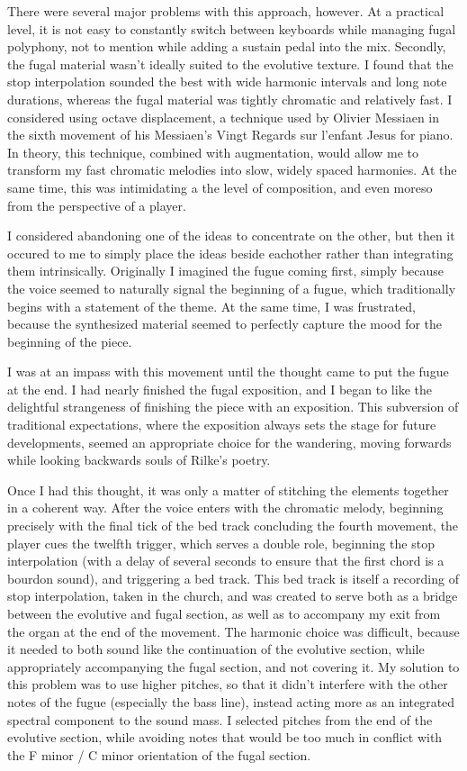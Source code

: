 \documentclass[12pt,twoside,maitrise]{dms_ks}
\theoremstyle{definition}
\begin{document}
{There were several major problems with this approach, however. At a practical level, it is not easy to constantly switch between keyboards while managing fugal polyphony, not to mention while adding a sustain pedal into the mix. Secondly, the fugal material wasn't ideally suited to the evolutive texture. I found that the stop interpolation sounded the best with wide harmonic intervals and long note durations, whereas the fugal material was tightly chromatic and relatively fast. I considered using octave displacement, a technique used by Olivier Messiaen in the sixth movement of his Messiaen’s Vingt Regards sur l’enfant Jesus for piano. In theory, this technique, combined with augmentation, would allow me to transform my fast chromatic melodies into slow, widely spaced harmonies. At the same time, this was intimidating a the level of composition, and even moreso from the perspective of a player.

I considered abandoning one of the ideas to concentrate on the other, but then it occured to me to simply place the ideas beside eachother rather than integrating them intrinsically. Originally I imagined the fugue coming first, simply because the voice seemed to naturally signal the beginning of a fugue, which traditionally begins with a statement of the theme. At the same time, I was frustrated, because the synthesized material seemed to perfectly capture the mood for the beginning of the piece.

I was at an impass with this movement until the thought came to put the fugue at the end. I had nearly finished the fugal exposition, and I began to like the delightful strangeness of finishing the piece with an exposition. This subversion of traditional expectations, where the exposition always sets the stage for future developments, seemed an appropriate choice for the wandering, moving forwards while looking backwards souls of Rilke's poetry. 

Once I had this thought, it was only a matter of stitching the elements together in a coherent way. After the voice enters with the chromatic melody, beginning precisely with the final tick of the bed track concluding the fourth movement, the player cues the twelfth trigger, which serves a double role, beginning the stop interpolation (with a delay of several seconds to ensure that the first chord is a bourdon sound), and triggering a bed track. This bed track is itself a recording of stop interpolation, taken in the church, and was created to serve both as a bridge between the evolutive and fugal section, as well as to accompany my exit from the organ at the end of the movement. The harmonic choice was difficult, because it needed to both sound like the continuation of the evolutive section, while appropriately accompanying the fugal section, and not covering it. My solution to this problem was to use higher pitches, so that it didn't interfere with the other notes of the fugue (especially the bass line), instead acting more as an integrated spectral component to the sound mass. I selected pitches from the end of the evolutive section, while avoiding notes that would be too much in conflict with the F minor / C minor orientation of the fugal section.

}
\end{document}
